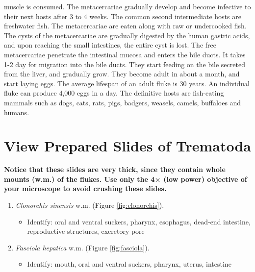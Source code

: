 muscle is consumed. The metacercariae gradually develop and become
infective to their next hosts after 3 to 4 weeks. The common second
intermediate hosts are freshwater fish. The metacercariae are eaten
along with raw or undercooked fish. The cysts of the metacercariae are
gradually digested by the human gastric acids, and upon reaching the
small intestines, the entire cyst is lost. The free metacercariae
penetrate the intestinal mucosa and enters the bile ducts. It takes 1-2
day for migration into the bile ducts. They start feeding on the bile
secreted from the liver, and gradually grow. They become adult in about
a month, and start laying eggs. The average lifespan of an adult fluke
is 30 years. An individual fluke can produce 4,000 eggs in a day. The
definitive hosts are fish-eating mammals such as dogs, cats, rats, pigs,
badgers, weasels, camels, buffaloes and humans.

\section{View Prepared Slides of
Trematoda}\label{view-prepared-slides-trematoda}

\textbf{Notice that these slides are very thick, since they contain
whole mounts (w.m.) of the flukes. Use only the 4× (low power) objective
of your microscope to avoid crushing these slides.}

\begin{enumerate}
\def\labelenumi{\arabic{enumi}.}
\tightlist
\item
  \emph{Clonorchis sinensis} w.m. (Figure \ref{fig:clonorchis}).

  \begin{itemize}
  \tightlist
  \item
    Identify: oral and ventral suckers, pharynx, esophagus, dead-end
    intestine, reproductive structures, excretory pore
  \end{itemize}
\item
  \emph{Fasciola hepatica} w.m. (Figure \ref{fig:fasciola}).

  \begin{itemize}
  \tightlist
  \item
    Identify: mouth, oral and ventral suckers, pharynx, uterus,
    intestine
  \end{itemize}
\end{enumerate}

